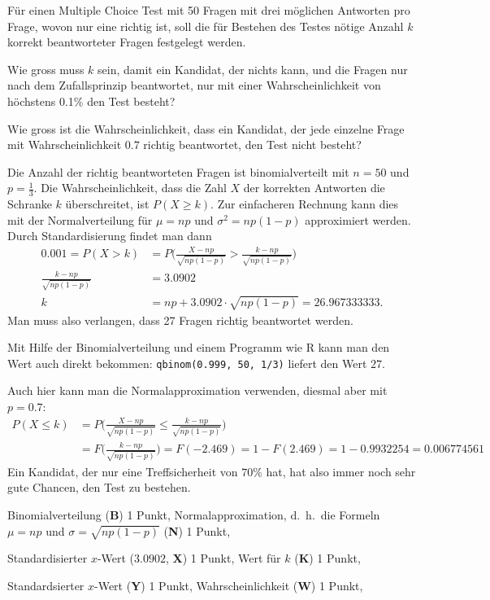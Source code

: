 Für einen Multiple Choice Test mit 50 Fragen mit drei möglichen Antworten
pro Frage, wovon nur eine richtig ist, soll die für
Bestehen des Testes nötige Anzahl $k$ korrekt beantworteter Fragen
festgelegt werden.
\begin{teilaufgaben}
\item Wie gross muss $k$ sein, damit ein Kandidat,
der nichts kann, und die Fragen nur nach dem Zufallsprinzip beantwortet,
nur mit einer Wahrscheinlichkeit von höchstens 0.1\% den Test besteht?
\item Wie gross ist die Wahrscheinlichkeit, dass ein Kandidat, der jede
einzelne Frage mit Wahrscheinlichkeit $0.7$ richtig beantwortet, den
Test nicht besteht?
\end{teilaufgaben}

\begin{loesung}
\begin{teilaufgaben}
\item Die Anzahl der richtig beantworteten Fragen ist binomialverteilt
mit $n=50$ und $p=\frac13$. Die Wahrscheinlichkeit, dass die Zahl $X$
der korrekten Antworten die Schranke $k$ überschreitet, ist $P(X\ge k)$.
Zur einfacheren Rechnung kann dies mit der Normalverteilung für
$\mu = np$ und $\sigma^2=np(1-p)$ approximiert werden. Durch Standardisierung
findet man dann
\begin{align*}
0.001=P(X>k)
&=
P\biggl(
\frac{X-np}{\sqrt{np(1-p)}}>\frac{k-np}{\sqrt{np(1-p)}}
\biggr)
\\
\frac{k-np}{\sqrt{np(1-p)}}&=3.0902
\\
k&= np+3.0902\cdot \sqrt{np(1-p)}
=26.967333333.
\end{align*}
Man muss also verlangen, dass 27 Fragen richtig beantwortet werden.

Mit Hilfe der Binomialverteilung und einem Programm wie R kann man den
Wert auch direkt bekommen:
\texttt{qbinom(0.999, 50, 1/3)}
liefert den Wert $27$.
\item
Auch hier kann man die Normalapproximation verwenden, diesmal aber mit
$p=0.7$:
\begin{align*}
P(X\le k)&=
P\biggl(
\frac{X-np}{\sqrt{np(1-p)}}\le\frac{k-np}{\sqrt{np(1-p)}}
\biggr)
\\
&=F\biggl(
\frac{k-np}{\sqrt{np(1-p)}}
\biggr)
=F(-2.469)=1-F(2.469)=1-0.9932254=0.006774561
\end{align*}
Ein Kandidat, der nur eine Treffsicherheit von $70\%$ hat, hat also
immer noch sehr gute Chancen, den Test zu bestehen.
\qedhere
\end{teilaufgaben}
\end{loesung}

\begin{bewertung}
Binomialverteilung (\textbf{B}) 1 Punkt,
Normalapproximation, d.~h.~die Formeln $\mu=np$ und $\sigma=\sqrt{np(1-p)}$
(\textbf{N}) 1 Punkt,
\begin{teilaufgaben}
\item
Standardisierter $x$-Wert ($3.0902$, \textbf{X}) 1 Punkt,
Wert für $k$ (\textbf{K}) 1 Punkt,
\item
Standardsierter $x$-Wert (\textbf{Y}) 1 Punkt,
Wahrscheinlichkeit (\textbf{W}) 1 Punkt,
\end{teilaufgaben}
\end{bewertung}

